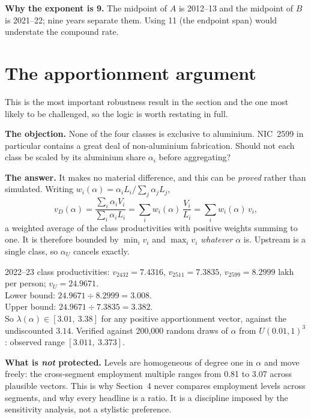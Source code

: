 \documentclass[11pt, a4paper]{article}
\begin{document}
\noindent \textbf{Why the exponent is 9.} The midpoint of $A$ is 2012--13 and the
midpoint of $B$ is 2021--22; nine years separate them. Using 11 (the endpoint span)
would understate the compound rate.

\section{The apportionment argument}
\label{sec:alpha}

This is the most important robustness result in the section and the one most likely to
be challenged, so the logic is worth restating in full.

\textbf{The objection.} None of the four classes is exclusive to aluminium. NIC~2599
in particular contains a great deal of non-aluminium fabrication. Should not each
class be scaled by its aluminium share $\alpha_i$ before aggregating?

\textbf{The answer.} It makes no material difference, and this can be \emph{proved}
rather than simulated. Writing $w_i(\alpha) = \alpha_i L_i / \sum_j \alpha_j L_j$,
\[
v_D(\alpha) = \frac{\sum_i \alpha_i V_i}{\sum_i \alpha_i L_i}
= \sum_i w_i(\alpha)\, \frac{V_i}{L_i} = \sum_i w_i(\alpha)\, v_i ,
\]
a weighted average of the class productivities with positive weights summing to one.
It is therefore bounded by $\min_i v_i$ and $\max_i v_i$ \emph{whatever} $\alpha$ is.
Upstream is a single class, so $\alpha_U$ cancels exactly.

\begin{work}
2022--23 class productivities: $v_{2432} = 7.4316$, $v_{2511} = 7.3835$,
$v_{2599} = 8.2999$ lakh per person; $v_U = 24.9671$. \\[2pt]
Lower bound: $24.9671 \div 8.2999 = 3.008$. \\
Upper bound: $24.9671 \div 7.3835 = 3.382$. \\[2pt]
So $\lambda(\alpha) \in [3.01,\ 3.38]$ for any positive apportionment vector, against
the undiscounted $3.14$. Verified against 200{,}000 random draws of $\alpha$ from
$U(0.01, 1)^3$: observed range $[3.011,\ 3.373]$.
\end{work}

\begin{caution}
\textbf{What is \emph{not} protected.} Levels are homogeneous of degree one in
$\alpha$ and move freely: the cross-segment employment multiple ranges from 0.81 to
3.07 across plausible vectors. This is why Section~4 never compares employment levels
across segments, and why every headline is a ratio. It is a discipline imposed by the
sensitivity analysis, not a stylistic preference.
\end{caution}
\end{document}

